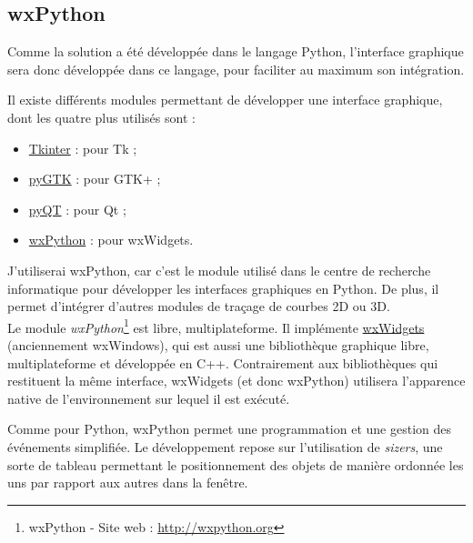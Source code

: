 
\subsection{wxPython}

Comme la solution a été développée dans le langage Python, l'interface graphique sera donc développée dans ce langage, pour faciliter au maximum son intégration.

Il existe différents modules permettant de développer une interface graphique, dont les quatre plus utilisés sont :
\begin{itemize}
	\item \href{http://wiki.python.org/moin/TkInter}{Tkinter} : pour Tk ;
	\item \href{http://www.pygtk.org}{pyGTK} : pour GTK+ ;
	\item \href{http://wiki.python.org/moin/PyQt}{pyQT} : pour Qt ;
	\item \href{http://wxpython.org}{wxPython} : pour wxWidgets.
\end{itemize}

J'utiliserai wxPython, car c'est le module utilisé dans le centre de recherche informatique pour développer les interfaces graphiques en Python.
De plus, il permet d'intégrer d'autres modules de traçage de courbes 2D ou 3D.
\\


Le module \textit{wxPython}\footnote{wxPython - Site web : \href{http://wxpython.org}{http://wxpython.org}} est libre, multiplateforme.
Il implémente \href{http://www.wxwidgets.org/}{wxWidgets} (anciennement wxWindows), qui est aussi une bibliothèque graphique libre, multiplateforme et développée en C++.
Contrairement aux bibliothèques qui restituent la même interface, wxWidgets (et donc wxPython) utilisera l'apparence native de l'environnement sur lequel il est exécuté.

Comme pour Python, wxPython permet une programmation et une gestion des événements simplifiée.
Le développement repose sur l'utilisation de \textit{sizers}, une sorte de tableau permettant le positionnement des objets de manière ordonnée les uns par rapport aux autres dans la fenêtre.
\\




